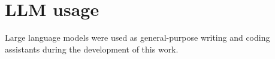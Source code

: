 \section{LLM usage}
\label{app:llm-usage}

Large language models were used as general-purpose writing and coding assistants during the development of this work.
